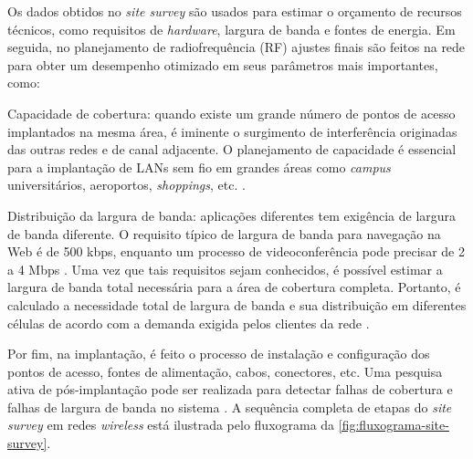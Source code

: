 Os dados obtidos no \textit{site survey} são usados para estimar o orçamento de recursos técnicos, como requisitos de \textit{hardware}, largura de banda e fontes de energia.
Em seguida, no planejamento de radiofrequência (RF) ajustes finais são feitos na rede para obter um desempenho otimizado em seus parâmetros mais importantes, como:

\begin{compactitem}
\item Capacidade de cobertura: quando existe um grande número de pontos de acesso implantados na mesma área, é iminente o surgimento de interferência originadas das outras redes e de canal adjacente. O planejamento de capacidade é essencial para a implantação de LANs sem fio em grandes áreas como \textit{campus} universitários, aeroportos, \textit{shoppings}, etc. \cite{kar2018ieee}.
  
\item Distribuição da largura de banda: aplicações diferentes tem exigência de largura de banda diferente. O requisito típico de largura de banda para navegação na Web é de 500 kbps, enquanto um processo de videoconferência pode precisar de 2 a 4 Mbps \cite{kar2018ieee}. Uma vez que tais requisitos sejam conhecidos, é possível estimar a largura de banda total necessária para a área de cobertura completa. Portanto, é calculado a necessidade total de largura de banda e sua distribuição em diferentes células de acordo com a demanda exigida pelos clientes da rede \cite{kar2018ieee}.
\end{compactitem}

Por fim, na implantação, é feito o processo de instalação e configuração dos pontos de acesso, fontes de alimentação, cabos, conectores, etc. Uma pesquisa ativa de pós-implantação pode ser realizada para detectar falhas de cobertura e falhas de largura de banda no sistema \cite{kar2018ieee}. A sequência completa de etapas do \textit{site survey} em redes \textit{wireless} está ilustrada pelo fluxograma da \autoref{fig:fluxograma-site-survey}.

